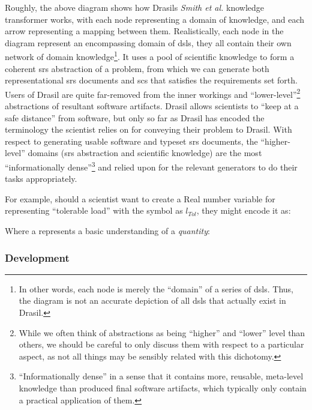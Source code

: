 \roughNetworkOfDomains{}

Roughly, the above diagram shows how Drasils \textit{Smith et al.} knowledge
transformer works, with each node representing a domain of knowledge, and each
arrow representing a mapping between them. Realistically, each node in the
diagram represent an encompassing domain of \acsp{dsl}, they all contain their
own network of domain knowledge\footnote{In other words, each node is merely the
      ``domain'' of a series of \acsp{dsl}. Thus, the diagram is not an accurate
      depiction of all \acsp{dsl} that actually exist in Drasil.}. It uses a pool of
scientific knowledge to form a coherent \acs{srs} abstraction of a problem, from
which we can generate both representational \acs{srs} documents and \acs{scs}
that satisfies the requirements set forth. Users of Drasil are quite far-removed
from the inner workings and ``lower-level''\footnote{While we often think of
      abstractions as being ``higher'' and ``lower'' level than others, we should be
      careful to only discuss them with respect to a particular aspect, as not all
      things may be sensibly related with this dichotomy.} abstractions of resultant
software artifacts. Drasil allows scientists to ``keep at a safe distance'' from
software, but only so far as Drasil has encoded the terminology the scientist
relies on for conveying their problem to Drasil. With respect to generating
usable software and typeset \acs{srs} documents, the ``higher-level'' domains
(\acs{srs} abstraction and scientific knowledge) are the most ``informationally
dense''\footnote{``Informationally dense'' in a sense that it contains more,
      reusable, meta-level knowledge than produced final software artifacts, which
      typically only contain a practical application of them.} and relied upon for the
relevant generators to do their tasks appropriately.

For example, should a scientist want to create a Real number variable for
representing ``tolerable load'' with the symbol as $l_{Tol}$, they might encode
it as:

\originalQuantityDictExampleHaskell{}

Where a \QuantityDict{} represents a basic understanding of a \textit{quantity}:

\originalQuantityDictHaskell{}


\subsubsection{Development}

